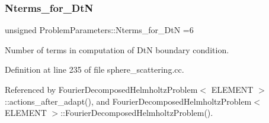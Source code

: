 \subsubsection{\texorpdfstring{Nterms\+\_\+for\+\_\+\+DtN}{Nterms\_for\_DtN}}
{\footnotesize\ttfamily unsigned Problem\+Parameters\+::\+Nterms\+\_\+for\+\_\+\+DtN =6}



Number of terms in computation of DtN boundary condition. 



Definition at line 235 of file sphere\+\_\+scattering.\+cc.



Referenced by Fourier\+Decomposed\+Helmholtz\+Problem$<$ E\+L\+E\+M\+E\+N\+T $>$\+::actions\+\_\+after\+\_\+adapt(), and Fourier\+Decomposed\+Helmholtz\+Problem$<$ E\+L\+E\+M\+E\+N\+T $>$\+::\+Fourier\+Decomposed\+Helmholtz\+Problem().

